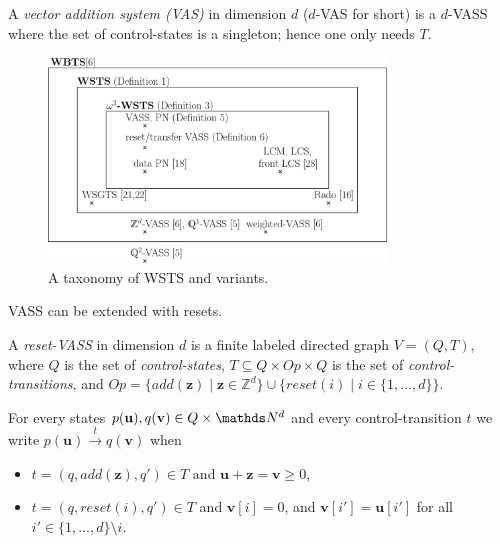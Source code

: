 \documentclass[runningheads]{llncs}
\newcommand{\alain}[1]{\todo[inline,color=red!20]{{\bf AF:} #1}}
\begin{document}
A {\em vector addition system (VAS)} in dimension $d$ ($d$-VAS for short) is a $d$-VASS where the set of control-states is a singleton; hence one only needs $T$.

 \begin{center}
	\begin{figure}
	\hspace{1.2cm}
\includegraphics[width=0.80\textwidth]{WSTS_taxonomy_large}
	\caption{A taxonomy of WSTS and variants.}
	\end{figure}
\end{center}

	\vspace{-0.9cm}

%

VASS can be extended with resets.

\begin{definition}
A {\em reset-VASS} in dimension $d$ 
 is a finite 
labeled directed graph $V = (Q,T)$, where $Q$ is the set of {\em control-states}, 
$T \subseteq Q \times Op \times Q$
is the set of {\em control-transitions}, and $Op = \{ add(\textbf{z}) \mid \textbf{z} \in \mathds{Z}^d\} \cup 
		\{ reset(i) \mid i \in \{1,\ldots,d\} \}$.
\end{definition}

For every states $p(\textbf{u}), q(\textbf{v}) \in Q \times \N^d$ and every control-transition $t$ we write
$p(\textbf{u}) \xrightarrow{t} q(\textbf{v})$ when 
\begin{samepage}\begin{itemize}
\item  $t = (q,add(\textbf{z}),q') \in T$
and $\textbf{u}+\textbf{z} = \textbf{v} \geq 0$,
\item $t = (q,reset(i),q') \in T$ 
and
$\textbf{v}[i] = 0$, and $\textbf{v}[i'] = \textbf{u}[i']$ for all $i' \in \{1,\ldots, d\} \setminus i$.
\end{itemize} \end{samepage}
\end{document}
